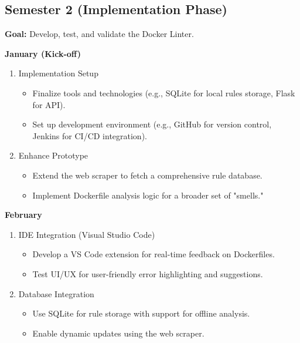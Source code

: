 \subsection{Semester 2 (Implementation Phase)}
\textbf{Goal:} Develop, test, and validate the Docker Linter.

\textbf{January (Kick-off)} 
\begin{enumerate}
    \item Implementation Setup
    \begin{itemize}
        \item Finalize tools and technologies (e.g., SQLite for local rules storage, Flask for API).
        \item Set up development environment (e.g., GitHub for version control, Jenkins for CI/CD integration).
    \end{itemize}
    \item Enhance Prototype
    \begin{itemize}
        \item Extend the web scraper to fetch a comprehensive rule database.
        \item Implement Dockerfile analysis logic for a broader set of "smells."
    \end{itemize}
\end{enumerate}

\textbf{February}
\begin{enumerate}
    \item IDE Integration (Visual Studio Code)
    \begin{itemize}
        \item Develop a VS Code extension for real-time feedback on Dockerfiles.
        \item Test UI/UX for user-friendly error highlighting and suggestions.
    \end{itemize}
    \item Database Integration
    \begin{itemize}
        \item Use SQLite for rule storage with support for offline analysis.
        \item Enable dynamic updates using the web scraper.
    \end{itemize}
\end{enumerate}

